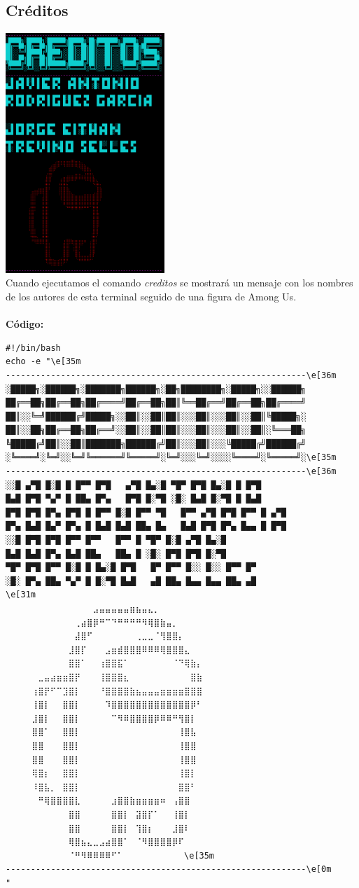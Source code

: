 \documentclass[12pt,a4paper]{article}
\begin{document}
\justifying
\subsection{Créditos}
    \centering
    \includegraphics[width=6cm]{img/creditos.png}
    \\
    \justifying
    \noindent
    Cuando ejecutamos el comando \textit{creditos} se mostrará un mensaje con los nombres de los autores de esta terminal seguido de una figura de Among Us.
    \\\\
    \newpage
    \textbf{Código:}
    \\
    \begin{lstlisting}[style=BashInputStyle]
#!/bin/bash
echo -e "\e[35m
------------------------------------------------------------\e[36m
░█████╗░██████╗░███████╗██████╗░██╗████████╗░█████╗░░██████╗
██╔══██╗██╔══██╗██╔════╝██╔══██╗██║╚══██╔══╝██╔══██╗██╔════╝
██║░░╚═╝██████╔╝█████╗░░██║░░██║██║░░░██║░░░██║░░██║╚█████╗░
██║░░██╗██╔══██╗██╔══╝░░██║░░██║██║░░░██║░░░██║░░██║░╚═══██╗
╚█████╔╝██║░░██║███████╗██████╔╝██║░░░██║░░░╚█████╔╝██████╔╝
░╚════╝░╚═╝░░╚═╝╚══════╝╚═════╝░╚═╝░░░╚═╝░░░░╚════╝░╚═════╝░\e[35m
------------------------------------------------------------\e[36m
░░█ ▄▀█ █░█ █ █▀▀ █▀█   ▄▀█ █▄░█ ▀█▀ █▀█ █▄░█ █ █▀█
█▄█ █▀█ ▀▄▀ █ ██▄ █▀▄   █▀█ █░▀█ ░█░ █▄█ █░▀█ █ █▄█
█▀█ █▀█ █▀▄ █▀█ █ █▀▀ █░█ █▀▀ ▀█   █▀▀ ▄▀█ █▀█ █▀▀ █ ▄▀█
█▀▄ █▄█ █▄▀ █▀▄ █ █▄█ █▄█ ██▄ █▄   █▄█ █▀█ █▀▄ █▄▄ █ █▀█
░░█ █▀█ █▀█ █▀▀ █▀▀   █▀▀ █ ▀█▀ █░█ ▄▀█ █▄░█
█▄█ █▄█ █▀▄ █▄█ ██▄   ██▄ █ ░█░ █▀█ █▀█ █░▀█
▀█▀ █▀█ █▀▀ █░█ █ █▄░█ █▀█   █▀ █▀▀ █░░ █░░ █▀▀ █▀
░█░ █▀▄ ██▄ ▀▄▀ █ █░▀█ █▄█   ▄█ ██▄ █▄▄ █▄▄ ██▄ ▄█
\e[31m
	⠀⠀⠀⠀⠀⠀⠀⠀⠀⠀⠀⣠⣤⣤⣤⣤⣤⣶⣦⣤⣄⡀⠀⠀⠀⠀⠀⠀⠀⠀ 
	⠀⠀⠀⠀⠀⠀⠀⠀⢀⣴⣿⡿⠛⠉⠙⠛⠛⠛⠛⠻⢿⣿⣷⣤⡀⠀⠀⠀⠀⠀ 
	⠀⠀⠀⠀⠀⠀⠀⠀⣼⣿⠋⠀⠀⠀⠀⠀⠀⠀⢀⣀⣀⠈⢻⣿⣿⡄⠀⠀⠀⠀ 
	⠀⠀⠀⠀⠀⠀⠀⣸⣿⡏⠀⠀⠀⣠⣶⣾⣿⣿⣿⠿⠿⠿⢿⣿⣿⣿⣄⠀⠀⠀ 
	⠀⠀⠀⠀⠀⠀⠀⣿⣿⠁⠀⠀⢰⣿⣿⣯⠁⠀⠀⠀⠀⠀⠀⠀⠈⠙⢿⣷⡄⠀ 
	⠀⠀⣀⣤⣴⣶⣶⣿⡟⠀⠀⠀⢸⣿⣿⣿⣆⠀⠀⠀⠀⠀⠀⠀⠀⠀⠀⣿⣷⠀ 
	⠀⢰⣿⡟⠋⠉⣹⣿⡇⠀⠀⠀⠘⣿⣿⣿⣿⣷⣦⣤⣤⣤⣶⣶⣶⣶⣿⣿⣿⠀ 
	⠀⢸⣿⡇⠀⠀⣿⣿⡇⠀⠀⠀⠀⠹⣿⣿⣿⣿⣿⣿⣿⣿⣿⣿⣿⣿⣿⡿⠃⠀ 
	⠀⣸⣿⡇⠀⠀⣿⣿⡇⠀⠀⠀⠀⠀⠉⠻⠿⣿⣿⣿⣿⡿⠿⠿⠛⢻⣿⡇⠀⠀ 
	⠀⣿⣿⠁⠀⠀⣿⣿⡇⠀⠀⠀⠀⠀⠀⠀⠀⠀⠀⠀⠀⠀⠀⠀⠀⢸⣿⣧⠀⠀ 
	⠀⣿⣿⠀⠀⠀⣿⣿⡇⠀⠀⠀⠀⠀⠀⠀⠀⠀⠀⠀⠀⠀⠀⠀⠀⢸⣿⣿⠀⠀ 
	⠀⣿⣿⠀⠀⠀⣿⣿⡇⠀⠀⠀⠀⠀⠀⠀⠀⠀⠀⠀⠀⠀⠀⠀⠀⢸⣿⣿⠀⠀ 
	⠀⢿⣿⡆⠀⠀⣿⣿⡇⠀⠀⠀⠀⠀⠀⠀⠀⠀⠀⠀⠀⠀⠀⠀⠀⢸⣿⡇⠀⠀ 
	⠀⠸⣿⣧⡀⠀⣿⣿⡇⠀⠀⠀⠀⠀⠀⠀⠀⠀⠀⠀⠀⠀⠀⠀⠀⣿⣿⠃⠀⠀ 
	⠀⠀⠛⢿⣿⣿⣿⣿⣇⠀⠀⠀⠀⠀⣰⣿⣿⣷⣶⣶⣶⣶⠶⠀⢠⣿⣿⠀⠀⠀ 
	⠀⠀⠀⠀⠀⠀⠀⣿⣿⠀⠀⠀⠀⠀⣿⣿⡇⠀⣽⣿⡏⠁⠀⠀⢸⣿⡇⠀⠀⠀ 
	⠀⠀⠀⠀⠀⠀⠀⣿⣿⠀⠀⠀⠀⠀⣿⣿⡇⠀⢹⣿⡆⠀⠀⠀⣸⣿⠇⠀⠀⠀ 
	⠀⠀⠀⠀⠀⠀⠀⢿⣿⣦⣄⣀⣠⣴⣿⣿⠁⠀⠈⠻⣿⣿⣿⣿⡿⠏⠀⠀⠀⠀ 
	⠀⠀⠀⠀⠀⠀⠀⠈⠛⠻⠿⠿⠿⠿⠋⠁⠀⠀⠀⠀⠀⠀⠀⠀⠀⠀\e[35m⠀
------------------------------------------------------------\e[0m
"
    \end{lstlisting}
\end{document}
